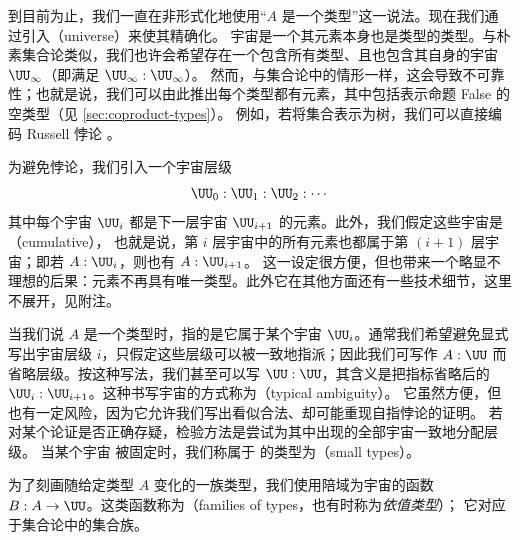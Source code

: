 到目前为止，我们一直在非形式化地使用“$A$ 是一个类型”这一说法。现在我们通过引入（universe）来使其精确化。
%
%
宇宙是一个其元素本身也是类型的类型。与朴素集合论类似，我们也许会希望存在一个包含所有类型、且也包含其自身的宇宙 $\UU_\infty$（即满足 $\UU_\infty : \UU_\infty$）。
然而，与集合论中的情形一样，这会导致不可靠性；也就是说，我们可以由此推出每个类型都有元素，其中包括表示命题 False 的空类型（见 \cref{sec:coproduct-types}）。
例如，若将集合表示为树，我们可以直接编码 Russell 悖论 \cite{coquand:paradox}。

为避免悖论，我们引入一个宇宙层级
%
\[ \UU_0 : \UU_1 : \UU_2 : \cdots \]
其中每个宇宙 $\UU_i$ 都是下一层宇宙 $\UU_{i+1}$ 的元素。此外，我们假定这些宇宙是（cumulative），
%
%
也就是说，第 $i$ 层宇宙中的所有元素也都属于第 $(i+1)$ 层宇宙；即若 $A:\UU_i$，则也有 $A:\UU_{i+1}$。
这一设定很方便，但也带来一个略显不理想的后果：元素不再具有唯一类型。此外它在其他方面还有一些技术细节，这里不展开，见附注。

当我们说 $A$ 是一个类型时，指的是它属于某个宇宙 $\UU_i$。通常我们希望避免显式写出宇宙层级
%
%
%
$i$，只假定这些层级可以被一致地指派；因此我们可写作 $A:\UU$ 而省略层级。按这种写法，我们甚至可以写 $\UU:\UU$，其含义是把指标省略后的 $\UU_i:\UU_{i+1}$。这种书写宇宙的方式称为（typical ambiguity）。
%
它虽然方便，但也有一定风险，因为它允许我们写出看似合法、却可能重现自指悖论的证明。
若对某个论证是否正确存疑，检验方法是尝试为其中出现的全部宇宙一致地分配层级。
当某个宇宙 \UU 被固定时，我们称属于 \UU 的类型为（small types）。
%
%

为了刻画随给定类型 $A$ 变化的一族类型，我们使用陪域为宇宙的函数 $B : A \to \UU$。这类函数称为（families of types，也有时称为\emph{依值类型}）；
%
%
%
%
它对应于集合论中的集合族。


